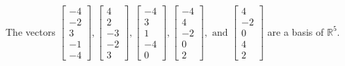 \begin{exercise}
\begin{exerciseStatement}
  \end{exerciseStatement}
  \begin{exerciseAnswer}
   The vectors \(\left[\begin{array}{r}
-4 \\
-2 \\
3 \\
-1 \\
-4
\end{array}\right] , \left[\begin{array}{r}
4 \\
2 \\
-3 \\
-2 \\
3
\end{array}\right] , \left[\begin{array}{r}
-4 \\
3 \\
1 \\
-4 \\
0
\end{array}\right] , \left[\begin{array}{r}
-4 \\
4 \\
-2 \\
0 \\
2
\end{array}\right] , \text{ and } \left[\begin{array}{r}
4 \\
-2 \\
0 \\
4 \\
2
\end{array}\right]\) 
  	 are  a basis of \(\mathbb{R}^5\).
  


  \end{exerciseAnswer}
\end{exercise}